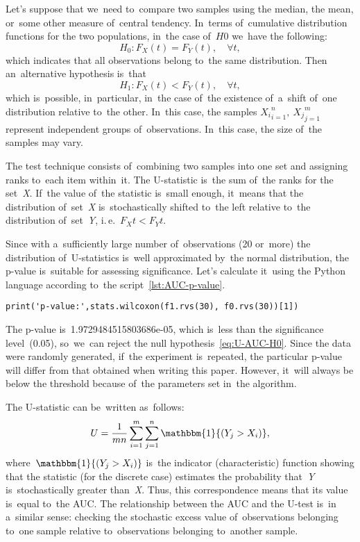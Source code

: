 \documentclass[]{scrreprt}
\begin{document}
Let's suppose that we~need to~compare two samples using the median, the mean, or~some other measure of~central tendency. In~terms of~cumulative distribution functions for the two populations, in~the case of~$H0$ we~have the following:
\begin{equation}\label{eq:U-AUC-H0}
H_0: F_{X}(t) = F_{Y}(t), \quad \forall t,
\end{equation}
which indicates that all observations belong to~the same distribution. Then an~alternative hypothesis is~that
\begin{equation}\label{eq:U-AUC-H1}
H_1: F_{X}(t) < F_{Y}(t), \quad \forall t,
\end{equation}
which is~possible, in~particular, in~the case of~the existence of~a~shift of~one distribution relative to~the other. In~this case, the samples ${X_{i}}_{i=1}^{n},\ {X_{j}}_{j=1}^{m}$ represent independent groups of~observations. In~this case, the size of~the samples may vary.

The test technique consists of~combining two samples into one set and assigning ranks to~each item within~it. The U-statistic is~the sum of~the ranks for the set~\textit{X}. If~the value of~the statistic is~small enough, it~means that the distribution of~set~\textit{X} is~stochastically shifted to~the left relative to~the distribution of~set~\textit{Y}, i.\,e.~$F_{X}{t} < F_{Y}{t}$.

Since with a~sufficiently large number of~observations (20 or~more) the distribution of~U-statistics is~well approximated by~the normal distribution, the p-value is~suitable for assessing significance. Let's calculate it~using the Python language according to~the script~\ref{lst:AUC-p-value}.
%
\begin{lstlisting}[float=htp, caption = Calculation of~the p-value for the test data, firstnumber=1, label= lst:AUC-p-value]
print('p-value:',stats.wilcoxon(f1.rvs(30), f0.rvs(30))[1])

\end{lstlisting}
The p-value is~1.9729484515803686e-05, which is~less than the significance level~(0.05), so~we~can reject the null hypothesis~\ref{eq:U-AUC-H0}. Since the data were randomly generated, if~the experiment is~repeated, the particular p-value will differ from that obtained when writing this paper. However, it~will always be below the threshold because of~the parameters set in~the algorithm.

The U-statistic can be~written as~follows:
\begin{equation}\label{eq:U-statistics}
U = \frac{1}{mn}\sum_{i=1}^{m}\sum_{j=1}^{n}\mathbbm{1}{(Y_{j}>X_{i})},
\end{equation}
where~$\mathbbm{1}{(Y_{j}>X_{i})}$ is~the indicator (characteristic) function showing that the statistic (for the discrete case) estimates the probability that~\textit{Y} is~stochastically greater than~\textit{X}. Thus, this correspondence means that its value is~equal to~the AUC. The relationship between the AUC and the U-test is~in a~similar sense: checking the stochastic excess value of~observations belonging to~one sample relative to~observations belonging to~another sample.
%
\end{document}
